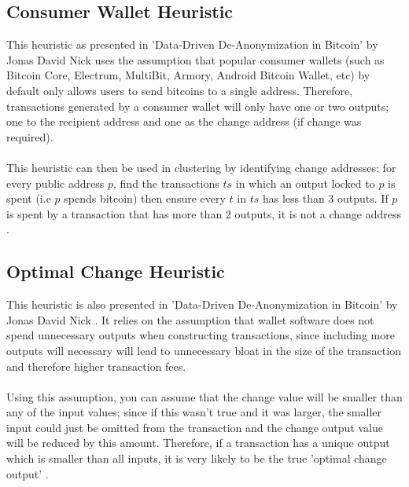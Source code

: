 \subsection{Consumer Wallet Heuristic}\label{background:consumer-wallet-heuristic}
This heuristic as presented in 'Data-Driven De-Anonymization in Bitcoin' by Jonas David Nick \cite{RefWorks:doc:5cfa2acee4b0132e0223d6f7} uses the assumption that popular consumer wallets (such as  Bitcoin Core, Electrum, MultiBit, Armory, Android Bitcoin Wallet, etc) by default only allows users to send bitcoins to a single address. Therefore, transactions generated by a consumer wallet will only have one or two outputs; one to the recipient address and one as the change address (if change was required). 
\\\\
This heuristic can then be used in clustering by identifying change addresses: for every public address $p$, find the transactions $ts$ in which an output locked to $p$ is spent (i.e $p$ spends bitcoin) then ensure every $t$ in $ts$ has less than 3 outputs. If $p$ is spent by a transaction that has more than 2 outputs, it is not a change address \cite{RefWorks:doc:5cfa2acee4b0132e0223d6f7} . 

\subsection{Optimal Change Heuristic}\label{background:optimal-change-heuristic}
This heuristic is also presented in 'Data-Driven De-Anonymization in Bitcoin' by Jonas David Nick \cite{RefWorks:doc:5cfa2acee4b0132e0223d6f7}. It relies on the assumption that wallet software does not spend unnecessary outputs when constructing transactions, since including more outputs will necessary will lead to unnecessary bloat in the size of the transaction and therefore higher transaction fees.
\\\\
Using this assumption, you can assume that the change value will be smaller than any of the input values; since if this wasn't true and it was larger, the smaller input could just be omitted from the transaction and the change output value will be reduced by this amount. Therefore, if a transaction has a unique output which is smaller than all inputs, it is very likely to be the true 'optimal change output' \cite{RefWorks:doc:5cfa2acee4b0132e0223d6f7}.


